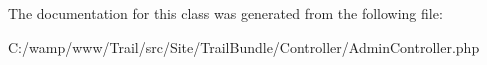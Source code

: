 The documentation for this class was generated from the following file\+:\begin{DoxyCompactItemize}
\item 
C\+:/wamp/www/\+Trail/src/\+Site/\+Trail\+Bundle/\+Controller/Admin\+Controller.\+php\end{DoxyCompactItemize}

